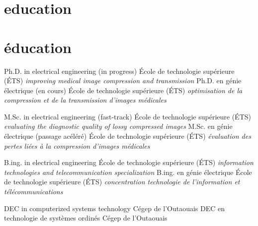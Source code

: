 \documentclass[print]{friggeri-cv}
\begin{document}

\ifdefined\isenglish\section{education}\else\section{éducation}\fi

\begin{entrylist}
  \ifdefined\isenglish
     {Ph.D. in electrical engineering (in progress)} {École de technologie supérieure {\scriptsize (ÉTS)}} {\emph{improving medical image compression and transmission}}
  \else
     {Ph.D. en génie électrique (en cours)} {École de technologie supérieure {\scriptsize (ÉTS)}} {\emph{optimisation de la compression et de la transmission d'images médicales}}
  \fi

  \ifdefined\isenglish
     {M.Sc. in electrical engineering (fast-track)} {École de technologie supérieure {\scriptsize (ÉTS)}} {\emph{evaluating the diagnostic quality of lossy compressed images}}
  \else
     {M.Sc. en génie électrique (passage acéléré)} {École de technologie supérieure {\scriptsize (ÉTS)}} {\emph{évaluation des pertes liées à la compression d'images médicales}}
  \fi

  \ifdefined\isenglish
     {B.ing. in electrical engineering} {École de technologie supérieure {\scriptsize (ÉTS)}} {\emph{information technologies and telecommunication specialization}}
  \else
     {B.ing. en génie électrique} {École de technologie supérieure {\scriptsize (ÉTS)}} {\emph{concentration technologie de l'information et télécommunications}}
  \fi

  \ifdefined\isenglish
     {DEC in computerized systems technology} {Cégep de l’Outaouais} {}
  \else
     {DEC en technologie de systèmes ordinés} {Cégep de l’Outaouais} {}
  \fi
\end{entrylist}


\end{document}
